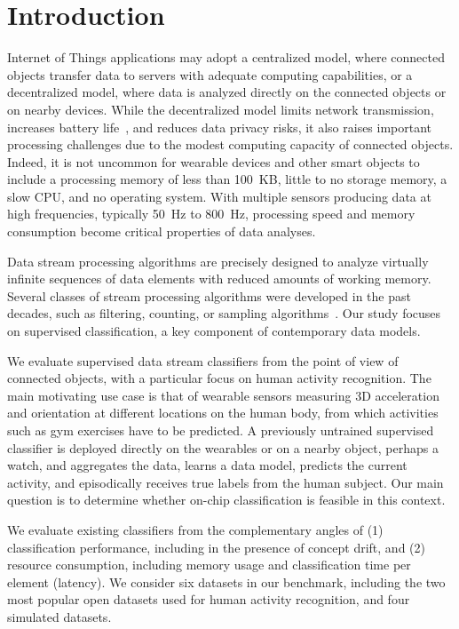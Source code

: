 \section{Introduction}
\label{sec:introduction}

Internet of Things applications may adopt a
centralized model, where connected objects transfer data to servers with 
adequate computing capabilities, or a decentralized model, where data is analyzed directly on the connected
objects or on nearby devices. While the decentralized model limits network transmission,
increases battery life~\cite{sensor-network-survey, sensor-energy-model},
and reduces data privacy risks, it also raises important processing challenges
due to the modest computing capacity of connected objects. Indeed, it is not uncommon for wearable devices and other smart objects
to include a processing memory of less than 100~KB, little to no storage
memory, a slow CPU, and no operating system. With multiple sensors
producing data at high frequencies, typically 50~Hz to 800~Hz, processing speed and
memory consumption become critical properties of data analyses. 

Data stream processing algorithms are precisely designed to analyze
virtually infinite sequences of data elements with reduced amounts of
working memory. Several classes of stream processing algorithms were
developed in the past decades, such as filtering, counting, or sampling
algorithms~\cite{kejariwal2015}.  Our study focuses on supervised
classification, a key component of contemporary data models.

We evaluate supervised data stream classifiers from
the point of view of connected objects, with a particular focus on human
activity recognition. The main motivating use case is that of wearable
sensors measuring 3D acceleration and orientation at different locations on
the human body, from which activities such as gym exercises have to be
predicted. A previously untrained supervised classifier is deployed directly on the wearables or on
a nearby object, perhaps a watch, and aggregates the data, learns a data model, predicts the current
activity, and episodically receives true labels from the human subject. Our
main question is to determine whether on-chip classification is feasible in
this context. 

We evaluate existing classifiers from the complementary angles of (1)
classification performance, including in the presence of concept drift, and
(2) resource consumption, including memory usage and classification time
per element (latency). We consider six datasets in our benchmark, including
the two most popular open datasets used for human activity recognition, and
four simulated datasets. 


